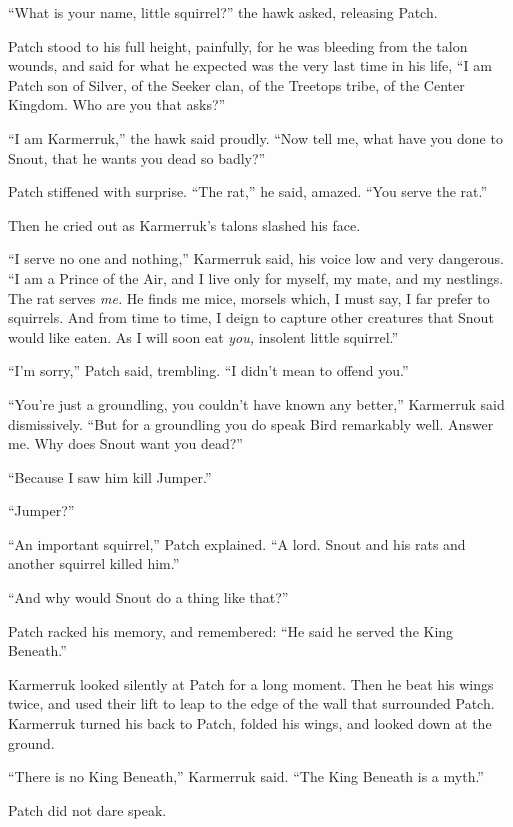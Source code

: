 \documentclass[ebook,oneside,openany,17pt]{memoir}
\newenvironment{tolerant}[1]{%
  \par\tolerance=#1\relax
}{%
  \par
}
\begin{document}
“What is your name, little squirrel?” the hawk asked, releasing Patch.

Patch stood to his full height, painfully, for he was bleeding from
the talon wounds, and said for what he expected was the very last time
in his life, “I am Patch son of Silver, of the Seeker clan, of the
Treetops tribe, of the Center Kingdom. Who are you that asks?”

“I am Karmerruk,” the hawk said proudly. “Now tell me, what have you
done to Snout, that he wants you dead so badly?”

Patch stiffened with surprise. “The rat,” he said, amazed. “You serve
the rat.”

Then he cried out as Karmerruk’s talons slashed his face.

“I serve no one and nothing,” Karmerruk said, his voice low and very
dangerous. “I am a Prince of the Air, and I live only for myself, my
mate, and my nestlings. The rat serves \emph{me.} He finds me mice,
morsels which, I must say, I far prefer to squirrels. And from time to
time, I deign to capture other creatures that Snout would like
eaten. As I will soon eat \emph{you,} insolent little squirrel.”

“I’m sorry,” Patch said, trembling. “I didn’t mean to offend you.”

\begin{tolerant}{2000}
“You’re just a groundling, you couldn’t have known any better,”
Karmerruk said dismissively. “But for a groundling you do speak Bird
remarkably well. Answer me. Why does Snout want you dead?”
\end{tolerant}

“Because I saw him kill Jumper.”

“Jumper?”

“An important squirrel,” Patch explained. “A lord. Snout and his rats
and another squirrel killed him.”

“And why would Snout do a thing like that?”

Patch racked his memory, and remembered: “He said he served the King
Beneath.”

Karmerruk looked silently at Patch for a long moment. Then he beat his
wings twice, and used their lift to leap to the edge of the wall that
surrounded Patch. Karmerruk turned his back to Patch, folded his
wings, and looked down at the ground.

“There is no King Beneath,” Karmerruk said. “The King Beneath is a
myth.”

Patch did not dare speak.
\end{document}
